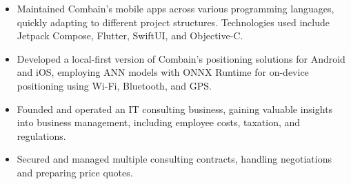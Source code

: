 \documentclass[10pt,a4paper,ragged2e]{altacv}
\begin{document}

\begin{fullwidth}
\makecvheader
\end{fullwidth}



\begin{itemize}
\item Maintained Combain’s mobile apps across various programming languages, quickly adapting to different project structures. Technologies used include Jetpack Compose, Flutter, SwiftUI, and Objective-C.
\item Developed a local-first version of Combain’s positioning solutions for Android and iOS, employing ANN models with ONNX Runtime for on-device positioning using Wi-Fi, Bluetooth, and GPS.
\end{itemize}

\divider

\begin{itemize}
\item Founded and operated an IT consulting business, gaining valuable insights into business management, including employee costs, taxation, and regulations.
\item Secured and managed multiple consulting contracts, handling negotiations and preparing price quotes.
\end{itemize}
\end{document}
